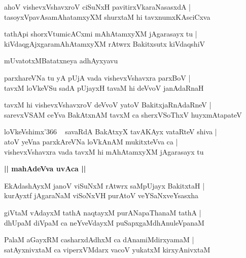 \documentclass[twoside,12pt,openright]{book}
\newcounter{shloka}[chapter]
\def\uvaca#1{\centerline{{\large\textbf{#1}}}}
\begin{document}
\begin{shloka}%
ahoV vishevxVshavxroV ciSuNxH pavitirxVkaraNasasxdA |\\
tasoyxVpavAsamAhatamxyXM shurxtaM hi tavxnumxKAsciCxva
\end{shloka}

\begin{shloka}%
tathApi shorxVtumicACxmi mAhAtamxyXM jAgarasayx tu |\\
kiVdaqgAjxgaramAhAtamxyXM rAtwrx Bakitxsutx kiVdaqshiV
\end{shloka}

\begin{center}
mUvatotxMBatatxneya adhAyxyavu
\end{center}

\begin{shloka}%
parxhareVNa tu yA pUjA vada vishevxVshavxra parxBoV |\\
tavxM loVkeVSu sadA pUjayxH tavaM hi deVvoV janAdaRnaH
\end{shloka}

\begin{shloka}%
tavxM hi vishevxVshavxroV deVvoV yatoV BakitxjaRnAdaRneV |\\
sarevxVSAM ceYva BakAtxnAM tavxM ca sherxVSoThxV huyxmAtapateV 
\end{shloka}

\begin{shloka}%
loVkeVshimx\char'366 ~ savaRdA BakAtxyX tavAKAyx vataRteV shiva |\\
atoV yeVna parxkAreVNa loVkAnAM mukitxteVva ca |\\
vishevxVshavxra vada tavxM hi mAhAtamxyXM jAgarasayx tu
\end{shloka}

\uvaca{|| mahAdeVva uvAca ||}

\begin{shloka}%
EkAdashAyxM janoV viSuNxM rAtwrx saMpUjayx BakitxtaH |\\
kurAyxtf jAgaraNaM viSoNxVH purAtoV veYSaNxveYsasxha
\end{shloka}

\begin{shloka}%
giVtaM vAdayxM tathA naqtayxM purANapaThanaM tathA |\\
dhUpaM diVpaM ca neYveVdayxM puSapxgaMdhAnuleVpanaM 
\end{shloka}

\begin{shloka}%
PalaM aGayxRM casharxdAdhxM ca dAnamiMdirxyamaM |\\
satAyxnivxtaM ca viperxVMdarx vacoV yukatxM kirxyAnivxtaM 
\end{shloka}
\end{document}
